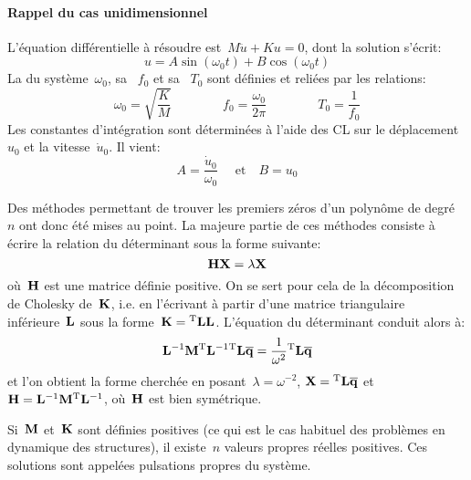 \paragraph{Rappel du cas unidimensionnel}
L'équation différentielle à résoudre est~$M\ddot{u}+Ku=0$,
dont la solution s'écrit: \begin{equation} u=A\sin (\omega_0 t)+B\cos(\omega_0 t) \end{equation}
La  du système~$\omega_0$, sa ~$f_0$ et sa ~$T_0$ sont définies et reliées par les relations:
\begin{equation}
\omega_0=\sqrt{\dfrac{K}M} \qquad\qquad f_0=\dfrac{\omega_0}{2\pi} \qquad\qquad T_0=\dfrac1{f_0}
\end{equation}
Les constantes d'intégration sont déterminées à l'aide des CL sur le déplacement~$u_0$ et la
vitesse~$\dot{u}_0$. Il vient: \begin{equation} A=\frac{\dot{u}_0}{\omega_0} \quad\text{ et}\quad B=u_0\end{equation}

\medskip{}
Des méthodes permettant de trouver les premiers zéros d'un polynôme de degré~$n$ ont donc été
mises au point.
La majeure partie de ces méthodes consiste à écrire la relation du déterminant sous la forme suivante:
\begin{equation} \MM{H}\VV{X}=\lambda\VV{X} \end{equation}
où~$\MM{H}$ est une matrice définie positive.
\medskipvm
On se sert pour cela de la décomposition de Cholesky
de~$\MM{K}$, i.e. en l'écrivant à partir d'une matrice triangulaire inférieure~$\MM{L}$ sous la forme~$\MM{K}=\MMT{L}\MM{L}$.
\medskipvm
L'équation du déterminant conduit alors à:
\begin{equation} \MMI{L}\MM{M}\MMIT{L}\MMT{L}\VV{\overline{q}}=\frac1{\omega^2}\MMT{L}\VV{\overline{q}} \end{equation}
et l'on obtient la forme cherchée en posant~$\lambda=\omega^{-2}$, $\VV{X}=\MMT{L}\VV{\overline{q}}$
et~$\MM{H}=\MMI{L}\MM{M}\MMIT{L}$, où~$\MM{H}$ est bien symétrique.

\medskip
{}
Si~$\MM{M}$ et~$\MM{K}$ sont définies positives (ce qui est le cas habituel des problèmes en dynamique
des structures), il existe~$n$ valeurs propres réelles positives. Ces solutions sont appelées
pulsations propres du système.

